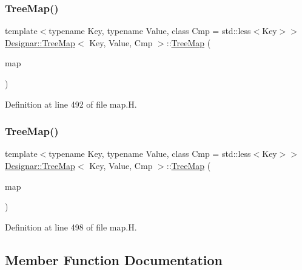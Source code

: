 \subsubsection{\texorpdfstring{Tree\+Map()}{TreeMap()}\hspace{0.1cm}{\footnotesize\ttfamily [6/7]}}
{\footnotesize\ttfamily template$<$typename Key, typename Value, class Cmp = std\+::less$<$\+Key$>$$>$ \\
\hyperlink{class_designar_1_1_tree_map}{Designar\+::\+Tree\+Map}$<$ Key, Value, Cmp $>$\+::\hyperlink{class_designar_1_1_tree_map}{Tree\+Map} (\begin{DoxyParamCaption}\item[{const \hyperlink{class_designar_1_1_tree_map}{Tree\+Map}$<$ Key, Value, Cmp $>$ \&}]{map }\end{DoxyParamCaption})\hspace{0.3cm}{\ttfamily [inline]}}



Definition at line 492 of file map.\+H.

\mbox{\label{class_designar_1_1_tree_map_a8c281295a0099d65d21f56f5787a8dd9}} 
\subsubsection{\texorpdfstring{Tree\+Map()}{TreeMap()}\hspace{0.1cm}{\footnotesize\ttfamily [7/7]}}
{\footnotesize\ttfamily template$<$typename Key, typename Value, class Cmp = std\+::less$<$\+Key$>$$>$ \\
\hyperlink{class_designar_1_1_tree_map}{Designar\+::\+Tree\+Map}$<$ Key, Value, Cmp $>$\+::\hyperlink{class_designar_1_1_tree_map}{Tree\+Map} (\begin{DoxyParamCaption}\item[{\hyperlink{class_designar_1_1_tree_map}{Tree\+Map}$<$ Key, Value, Cmp $>$ \&\&}]{map }\end{DoxyParamCaption})\hspace{0.3cm}{\ttfamily [inline]}}



Definition at line 498 of file map.\+H.



\subsection{Member Function Documentation}
\mbox{\label{class_designar_1_1_tree_map_a62214ac5be4a1d8d71e51e9b1a62d27a}} 
